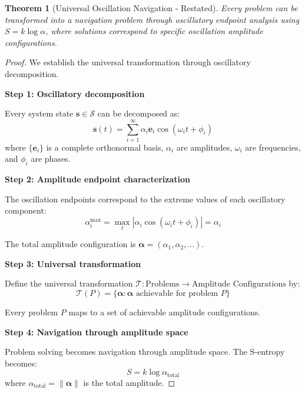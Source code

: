 \documentclass[12pt,a4paper]{article}
\newtheorem{theorem}{Theorem}
\begin{document}
\begin{theorem}[Universal Oscillation Navigation - Restated]
Every problem can be transformed into a navigation problem through oscillatory endpoint analysis using $S = k \log \alpha$, where solutions correspond to specific oscillation amplitude configurations.
\end{theorem}

\begin{proof}
We establish the universal transformation through oscillatory decomposition.

\textbf{Step 1: Oscillatory decomposition}

Every system state $\mathbf{s} \in \mathcal{S}$ can be decomposed as:
\begin{equation}
\mathbf{s}(t) = \sum_{i=1}^{\infty} \alpha_i \mathbf{e}_i \cos(\omega_i t + \phi_i)
\end{equation}
where $\{\mathbf{e}_i\}$ is a complete orthonormal basis, $\alpha_i$ are amplitudes, $\omega_i$ are frequencies, and $\phi_i$ are phases.

\textbf{Step 2: Amplitude endpoint characterization}

The oscillation endpoints correspond to the extreme values of each oscillatory component:
\begin{equation}
\alpha_i^{\max} = \max_{t} |\alpha_i \cos(\omega_i t + \phi_i)| = \alpha_i
\end{equation}

The total amplitude configuration is $\boldsymbol{\alpha} = (\alpha_1, \alpha_2, \ldots)$.

\textbf{Step 3: Universal transformation}

Define the universal transformation $\mathcal{T}: \text{Problems} \to \text{Amplitude Configurations}$ by:
\begin{equation}
\mathcal{T}(P) = \{\boldsymbol{\alpha} : \boldsymbol{\alpha} \text{ achievable for problem } P\}
\end{equation}

Every problem $P$ maps to a set of achievable amplitude configurations.

\textbf{Step 4: Navigation through amplitude space}

Problem solving becomes navigation through amplitude space. The S-entropy becomes:
\begin{equation}
S = k \log \alpha_{\text{total}}
\end{equation}
where $\alpha_{\text{total}} = \|\boldsymbol{\alpha}\|$ is the total amplitude.


\end{proof}
\end{document}

